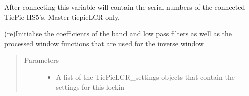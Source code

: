 \documentclass[letterpaper,10pt,english]{sphinxmanual}
\begin{document}
\begin{fulllineitems}
\begin{fulllineitems}
\label{\detokenize{index:TiePieLCR.TiePieLCR.select_LCR_gain}}
\end{fulllineitems}


\begin{fulllineitems}
\label{\detokenize{index:TiePieLCR.TiePieLCR.select_reference}}
\end{fulllineitems}


\begin{fulllineitems}
\label{\detokenize{index:TiePieLCR.TiePieLCR.serial_numbers}}
\sphinxAtStartPar
After connecting this variable will contain the serial numbers of the connected TiePie HS5’s.  Master tiepieLCR only.

\end{fulllineitems}


\begin{fulllineitems}
\label{\detokenize{index:TiePieLCR.TiePieLCR.set_settings}}
\sphinxAtStartPar
(re)Initialise the coefficients of the band and low pass filters as well as the processed window functions that are used for the inverse window
\begin{quote}\begin{description}
\item[{Parameters}] \leavevmode\begin{itemize}
\item {} 
\sphinxAtStartPar
{} \textendash{} A list of the TiePieLCR\_settings objects that contain the settings for this lockin


\end{itemize}
\end{description}
\end{quote}
\end{fulllineitems}
\end{fulllineitems}
\end{document}
